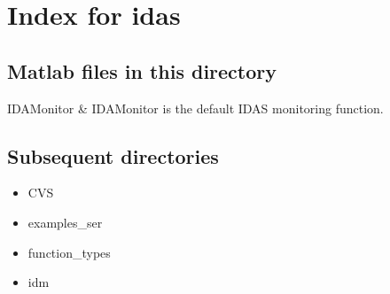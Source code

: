 \section{Index for {\sc idas}}

\subsection{Matlab files in this directory}

\begin{tabular}

IDAMonitor & IDAMonitor is the default IDAS monitoring function.  \\
\end{tabular}


\subsection{Subsequent directories}

\begin{itemize}


\item CVS
\item examples_ser
\item function_types
\item idm
\end{itemize}
